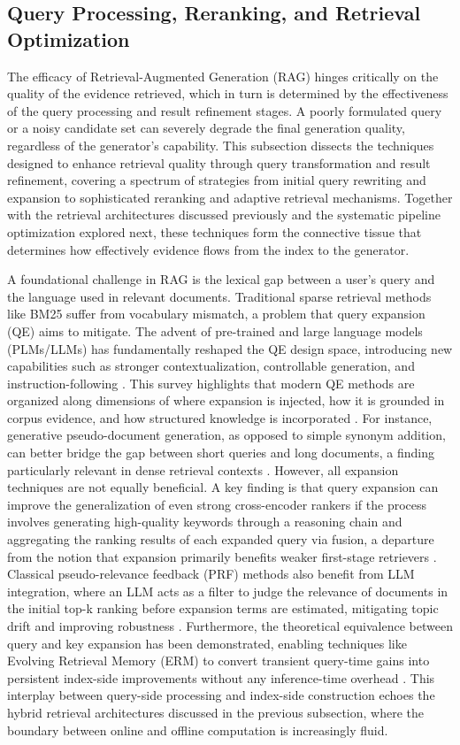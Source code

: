 \documentclass[11pt]{article}
\begin{document}
\subsection{Query Processing, Reranking, and Retrieval Optimization}

The efficacy of Retrieval-Augmented Generation (RAG) hinges critically on the quality of the evidence retrieved, which in turn is determined by the effectiveness of the query processing and result refinement stages. A poorly formulated query or a noisy candidate set can severely degrade the final generation quality, regardless of the generator's capability. This subsection dissects the techniques designed to enhance retrieval quality through query transformation and result refinement, covering a spectrum of strategies from initial query rewriting and expansion to sophisticated reranking and adaptive retrieval mechanisms. Together with the retrieval architectures discussed previously and the systematic pipeline optimization explored next, these techniques form the connective tissue that determines how effectively evidence flows from the index to the generator.

A foundational challenge in RAG is the lexical gap between a user's query and the language used in relevant documents. Traditional sparse retrieval methods like BM25 suffer from vocabulary mismatch, a problem that query expansion (QE) aims to mitigate. The advent of pre-trained and large language models (PLMs/LLMs) has fundamentally reshaped the QE design space, introducing new capabilities such as stronger contextualization, controllable generation, and instruction-following \cite{ref123}. This survey highlights that modern QE methods are organized along dimensions of where expansion is injected, how it is grounded in corpus evidence, and how structured knowledge is incorporated \cite{ref123}. For instance, generative pseudo-document generation, as opposed to simple synonym addition, can better bridge the gap between short queries and long documents, a finding particularly relevant in dense retrieval contexts \cite{ref124}. However, all expansion techniques are not equally beneficial. A key finding is that query expansion can improve the generalization of even strong cross-encoder rankers if the process involves generating high-quality keywords through a reasoning chain and aggregating the ranking results of each expanded query via fusion, a departure from the notion that expansion primarily benefits weaker first-stage retrievers \cite{ref125}. Classical pseudo-relevance feedback (PRF) methods also benefit from LLM integration, where an LLM acts as a filter to judge the relevance of documents in the initial top-k ranking before expansion terms are estimated, mitigating topic drift and improving robustness \cite{ref126}. Furthermore, the theoretical equivalence between query and key expansion has been demonstrated, enabling techniques like Evolving Retrieval Memory (ERM) to convert transient query-time gains into persistent index-side improvements without any inference-time overhead \cite{ref127}. This interplay between query-side processing and index-side construction echoes the hybrid retrieval architectures discussed in the previous subsection, where the boundary between online and offline computation is increasingly fluid.
\end{document}
